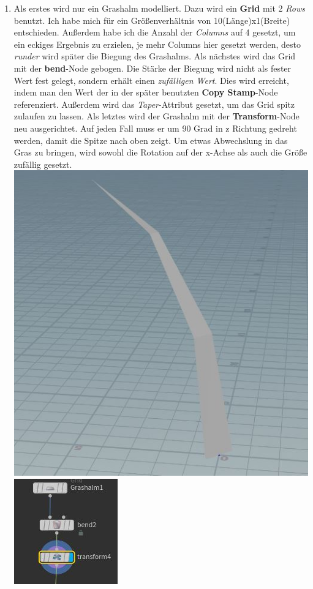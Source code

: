 \documentclass[paper=a4,fontsize=12pt,ngerman]{scrartcl}
\begin{document}
	\begin{enumerate}
		\item Als erstes wird nur ein Grashalm modelliert. Dazu wird ein \textbf{Grid} mit 2 \textit{Rows} benutzt. Ich habe mich für ein Größenverhältnis von 10(Länge)x1(Breite) entschieden. Außerdem habe ich die Anzahl der \textit{Columns} auf 4 gesetzt, um ein eckiges Ergebnis zu erzielen, je mehr Columns hier gesetzt werden, desto \textit{runder} wird später die Biegung des Grashalms. Als nächstes wird das Grid mit der \textbf{bend}-Node gebogen. Die Stärke der Biegung wird nicht als fester Wert fest gelegt, sondern erhält einen \textit{zufälligen Wert}. Dies wird erreicht, indem man den Wert der in der später benutzten \textbf{Copy Stamp}-Node referenziert. Außerdem wird das \textit{Taper}-Attribut gesetzt, um das Grid spitz zulaufen zu lassen. Als letztes wird der Grashalm mit der \textbf{Transform}-Node neu ausgerichtet. Auf jeden Fall muss er um 90 Grad in z Richtung gedreht werden, damit die Spitze nach oben zeigt. Um etwas Abwechslung in das Gras zu bringen, wird sowohl die Rotation auf der x-Achse als auch die Größe zufällig gesetzt. \\
		\includegraphics*[scale=0.47]{graphics/grass_3.jpg}
		\includegraphics*[scale=1.4]{graphics/grass_2.jpg}

\end{enumerate}
\end{document}
